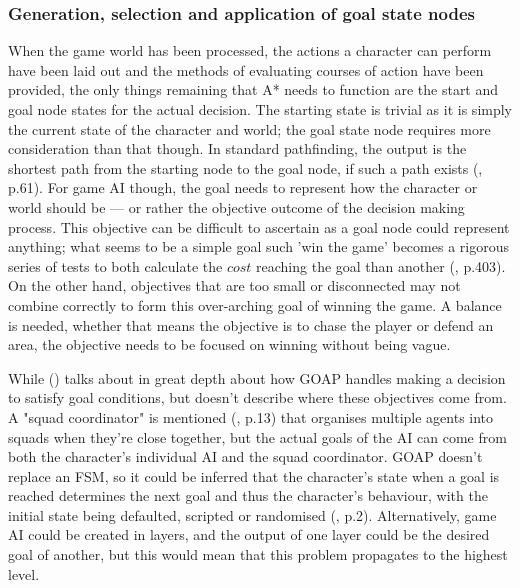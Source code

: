 \documentclass[11pt, a4paper]{article}
\begin{document}
\subsubsection{Generation, selection and application of goal state nodes}

When the game world has been processed, the actions a character can perform have been laid out and the methods of evaluating courses of action have been provided, the only things remaining that A* needs to function are the start and goal node states for the actual decision. The starting state is trivial as it is simply the current state of the character and world; the goal state node requires more consideration than that though. In standard pathfinding, the output is the shortest path from the starting node to the goal node, if such a path exists (\cite{nareyek2004ai}, p.61). For game AI though, the goal needs to represent how the character or world should be --- or rather the objective outcome of the decision making process. This objective can be difficult to ascertain as a goal node could represent anything; what seems to be a simple goal such 'win the game' becomes a rigorous series of tests to both calculate the $cost$ reaching the goal than another (\cite{harmon2002economic}, p.403). On the other hand, objectives that are too small or disconnected may not combine correctly to form this over-arching goal of winning the game. A balance is needed, whether that means the objective is to chase the player or defend an area, the objective needs to be focused on winning without being vague.

While \citeauthor{orkin2003applying} (\citeyear{orkin2003applying}) talks about in great depth about how GOAP handles making a decision to satisfy goal conditions, but doesn't describe where these objectives come from. A "squad coordinator" is mentioned (\cite{orkin2003applying}, p.13) that organises multiple agents into squads when they're close together, but the actual goals of the AI can come from both the character's individual AI and the squad coordinator. GOAP doesn't replace an FSM, so it could be inferred that the character's state when a goal is reached determines the next goal and thus the character's behaviour, with the initial state being defaulted, scripted or randomised (\cite{orkin2003applying}, p.2). Alternatively, game AI could be created in layers, and the output of one layer could be the desired goal of another, but this would mean that this problem propagates to the highest level. 
\end{document}
